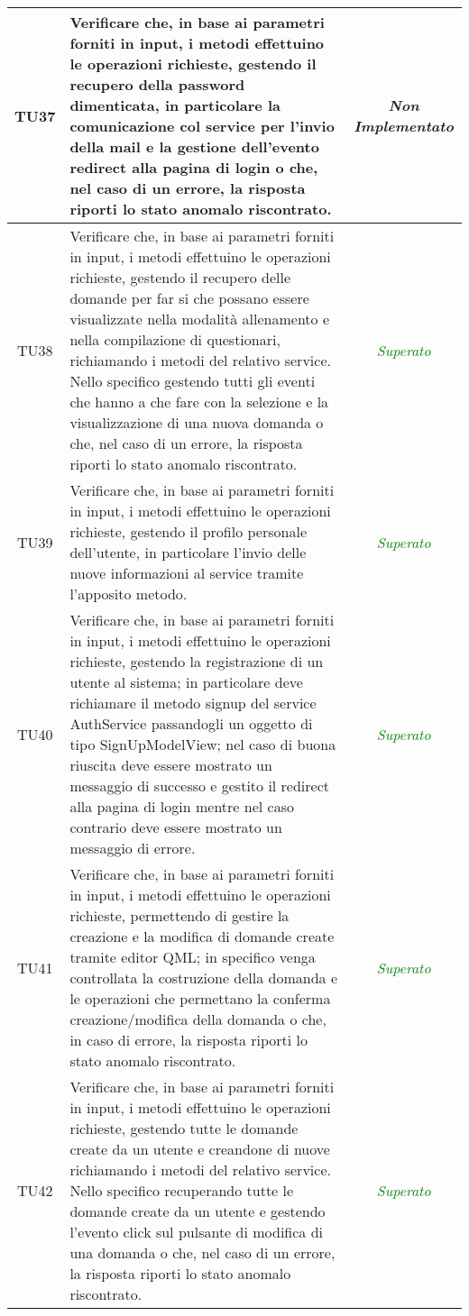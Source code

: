 \begin{longtable}{|c|>{}m{10cm}|c|}
\hypertarget{TU37}{TU37} & Verificare che, in base ai parametri forniti in input, i metodi effettuino le operazioni richieste, gestendo il recupero della password dimenticata, in particolare la comunicazione col service per l'invio della mail e la gestione dell'evento redirect alla pagina di login o che, nel caso di un errore, la risposta riporti lo stato anomalo riscontrato. & \textit{Non Implementato}\\ \hline
\hypertarget{TU38}{TU38} & Verificare che, in base ai parametri forniti in input, i metodi effettuino le operazioni richieste, gestendo il recupero delle domande per far si che possano essere visualizzate nella modalità allenamento e nella compilazione di questionari, richiamando i metodi del relativo service. Nello specifico gestendo tutti gli eventi che hanno a che fare con la selezione e la visualizzazione di una nuova domanda o che, nel caso di un errore, la risposta riporti lo stato anomalo riscontrato. & \textcolor{Green}{\textit{Superato}}\\ \hline
\hypertarget{TU39}{TU39} & Verificare che, in base ai parametri forniti in input, i metodi effettuino le operazioni richieste, gestendo il profilo personale dell'utente, in particolare l'invio delle nuove informazioni al service tramite l'apposito metodo. & \textcolor{Green}{\textit{Superato}}\\ \hline
\hypertarget{TU40}{TU40} & Verificare che, in base ai parametri forniti in input, i metodi effettuino le operazioni richieste, gestendo la registrazione di un utente al sistema; in particolare deve richiamare il metodo signup del service AuthService passandogli un oggetto
di tipo SignUpModelView; nel caso di buona riuscita deve essere mostrato un messaggio di successo e gestito il redirect alla pagina di login mentre nel caso contrario deve essere mostrato un messaggio di errore. & \textcolor{Green}{\textit{Superato}}\\ \hline
\hypertarget{TU41}{TU41} & Verificare che, in base ai parametri forniti in input, i metodi effettuino le operazioni richieste, permettendo di gestire la creazione e la modifica di domande create tramite editor QML; in specifico venga controllata la costruzione della domanda e le operazioni che permettano la conferma creazione/modifica della domanda o che, in caso di errore, la risposta riporti lo stato anomalo riscontrato. & \textcolor{Green}{\textit{Superato}}\\ \hline
\hypertarget{TU42}{TU42} & Verificare che, in base ai parametri forniti in input, i metodi effettuino le operazioni richieste, gestendo tutte le domande create da un utente e creandone di nuove richiamando i metodi del relativo service. Nello specifico recuperando tutte le domande create da un utente e gestendo l'evento click sul pulsante di modifica di una domanda o che, nel caso di un errore, la risposta riporti lo stato anomalo riscontrato. & \textcolor{Green}{\textit{Superato}}\\ \hline

\end{longtable}
